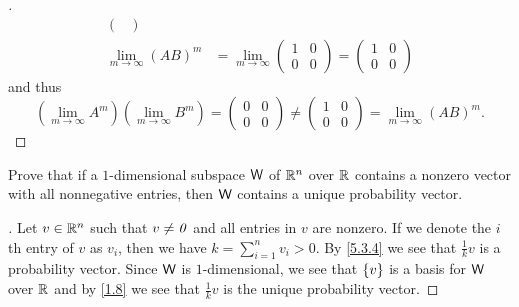 \begin{proof}[]
\begin{align*}
\begin{pmatrix}
		                                                                   \end{pmatrix} \\
		\lim_{m \to \infty} (AB)^m & = \lim_{m \to \infty} \begin{pmatrix}
			                                                   1 & 0 \\
			                                                   0 & 0
		                                                   \end{pmatrix} = \begin{pmatrix}
			                                                                   1 & 0 \\
			                                                                   0 & 0
		                                                                   \end{pmatrix}
	\end{align*}
	and thus
	\[
		(\lim_{m \to \infty} A^m) (\lim_{m \to \infty} B^m) = \begin{pmatrix}
			0 & 0 \\
			0 & 0
		\end{pmatrix} \neq \begin{pmatrix}
			1 & 0 \\
			0 & 0
		\end{pmatrix} = \lim_{m \to \infty} (AB)^m.
	\]
\end{proof}

\setcounter{ex}{14}
\begin{ex}\label{ex:5.3.15}
	Prove that if a \(1\)-dimensional subspace \(\mathsf{W}\) of \(\mathbb{R}^n\) over \(\mathbb{R}\) contains a nonzero vector with all nonnegative entries, then \(\mathsf{W}\) contains a unique probability vector.
\end{ex}

\begin{proof}[]
	Let \(v \in \mathbb{R}^n\) such that \(v \neq \mathit{0}\) and all entries in \(v\) are nonzero.
	If we denote the \(i\)th entry of \(v\) as \(v_i\), then we have \(k = \sum_{i = 1}^n v_i > 0\).
	By \cref{5.3.4} we see that \(\frac{1}{k} v\) is a probability vector.
	Since \(\mathsf{W}\) is \(1\)-dimensional, we see that \(\left\lbrace v\right\rbrace\) is a basis for \(\mathsf{W}\) over \(\mathbb{R}\) and by \cref{1.8} we see that \(\frac{1}{k} v\) is the unique probability vector.
\end{proof}

